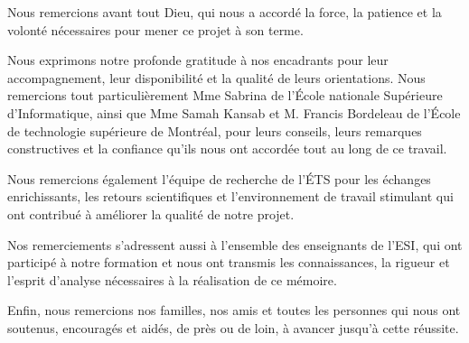
Nous remercions avant tout Dieu, qui nous a accordé la force, la patience et la volonté nécessaires pour mener ce projet à son terme.

Nous exprimons notre profonde gratitude à nos encadrants pour leur accompagnement, leur disponibilité et la qualité de leurs orientations. Nous remercions tout particulièrement Mme Sabrina de l'École nationale Supérieure d'Informatique, ainsi que Mme Samah Kansab et M. Francis Bordeleau de l'École de technologie supérieure de Montréal, pour leurs conseils, leurs remarques constructives et la confiance qu'ils nous ont accordée tout au long de ce travail.

Nous remercions également l'équipe de recherche de l'ÉTS pour les échanges enrichissants, les retours scientifiques et l'environnement de travail stimulant qui ont contribué à améliorer la qualité de notre projet.

Nos remerciements s'adressent aussi à l'ensemble des enseignants de l'ESI, qui ont participé à notre formation et nous ont transmis les connaissances, la rigueur et l'esprit d'analyse nécessaires à la réalisation de ce mémoire.

Enfin, nous remercions nos familles, nos amis et toutes les personnes qui nous ont soutenus, encouragés et aidés, de près ou de loin, à avancer jusqu'à cette réussite.

\clearpage

